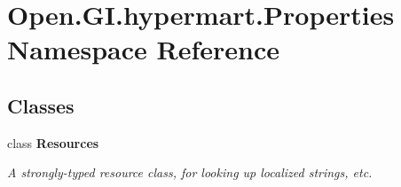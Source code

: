\section{Open.\+G\+I.\+hypermart.\+Properties Namespace Reference}
\label{namespace_open_1_1_g_i_1_1hypermart_1_1_properties}
\subsection*{Classes}
\begin{DoxyCompactItemize}
\item 
class {\bfseries Resources}
\begin{DoxyCompactList}\small\item\em A strongly-\/typed resource class, for looking up localized strings, etc. \end{DoxyCompactList}\end{DoxyCompactItemize}
